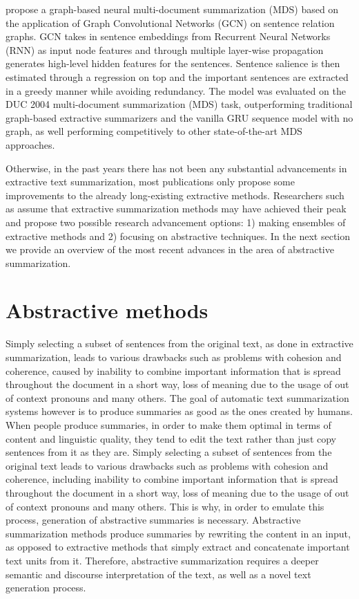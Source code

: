 \documentclass[11pt,a4paper,onecolumn]{article}
\begin{document}
 propose a graph-based neural multi-document summarization (MDS) based on the application of Graph Convolutional Networks (GCN) \cite{kipf2016semi} on sentence relation graphs.
GCN takes in sentence embeddings from Recurrent Neural Networks (RNN) as input node features and through multiple layer-wise propagation generates high-level hidden features for the sentences.
Sentence salience is then estimated through a regression on top and the important sentences are extracted in a greedy manner while avoiding redundancy.
The model was evaluated on the DUC 2004 multi-document summarization (MDS) task, outperforming traditional graph-based extractive summarizers and the vanilla GRU sequence model with no graph, as well performing competitively to other state-of-the-art MDS approaches.

Otherwise, in the past years there has not been any substantial advancements in extractive text summarization, most publications only propose some improvements to the already long-existing extractive methods.
Researchers such as  assume that extractive summarization methods may have achieved their peak and propose two possible research advancement options:  1) making ensembles of extractive methods and 2) focusing on abstractive techniques.
In the next section we provide an overview of the most recent advances in the area of abstractive summarization.

\section{Abstractive methods} \label{abstractive}
Simply selecting a subset of sentences from the original text, as done in extractive summarization, leads to various drawbacks such as problems with cohesion and coherence, caused by inability to combine important information that is spread throughout the document in a short way, loss of meaning due to the usage of out of context pronouns and many others.
The goal of automatic text summarization systems however is to produce summaries as good as the ones created by humans.
When people produce summaries, in order to make them optimal in terms of content and linguistic quality, they tend to edit the text rather than just copy sentences from it as they are.
Simply selecting a subset of sentences from the original text leads to various drawbacks such as problems with cohesion and coherence, including inability to combine important information that is spread throughout the document in a short way, loss of meaning due to the usage of out of context pronouns and many others.
This is why, in order to emulate this process, generation of abstractive summaries is necessary.
Abstractive summarization methods produce summaries by rewriting the content in an input, as opposed to extractive methods that simply extract and concatenate important text units from it.
Therefore, abstractive summarization requires a deeper semantic and discourse interpretation of the text, as well as a novel text generation process.
\end{document}
